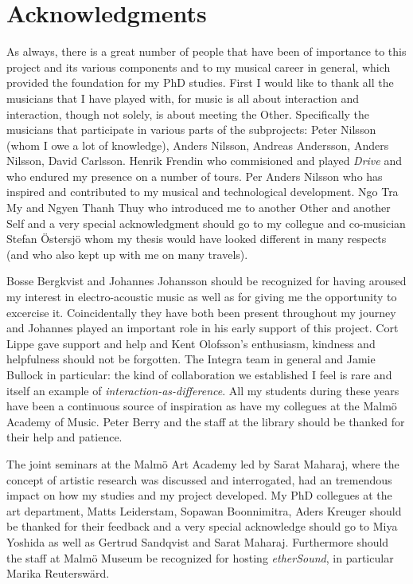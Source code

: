 \chapter{Acknowledgments}
\label{cha:acknowledgments}

As always, there is a great number of people that have been of importance to this project and its various components and to my musical career in general, which provided the foundation for my PhD studies. First I would like to thank all the musicians that I have played with, for music is all about interaction and interaction, though not solely, is about meeting the Other. Specifically the musicians that participate in various parts of the subprojects: Peter Nilsson (whom I owe a lot of knowledge), Anders Nilsson, Andreas
Andersson, Anders Nilsson, David Carlsson. Henrik Frendin who commisioned and played \emph{Drive} and who endured my presence on a number of tours. Per Anders Nilsson who has inspired and contributed to my musical and technological development. Ngo Tra My and Ngyen Thanh Thuy who introduced me to another Other and another Self and a very special acknowledgment should go to my collegue and co-musician Stefan \"{O}stersj\"{o} whom my thesis would have looked different in many respects (and who also kept up with me on many travels).

Bosse Bergkvist and Johannes Johansson should be recognized for having aroused my interest in electro-acoustic music as well as for giving me the opportunity to excercise it. Coincidentally they have both been present throughout my journey and Johannes played an important role in his early support of this project. Cort Lippe gave support and help and Kent Olofsson's enthusiasm, kindness and helpfulness should not be forgotten. The Integra team in general and Jamie Bullock in particular: the kind of collaboration we established I feel is rare and itself an example of \emph{interaction-as-difference}. All my students during these years have been a continuous source of inspiration as have my collegues at the Malm\"{o} Academy of Music. Peter Berry and the staff at the library should be thanked for their help and patience.

The joint seminars at the Malm\"{o} Art Academy led by Sarat Maharaj, where the concept of artistic research was discussed and interrogated, had an tremendous impact on how my studies and my project developed. My PhD collegues at the art department, Matts Leiderstam, Sopawan Boonnimitra, Aders Kreuger should be thanked for their feedback and a very special acknowledge should go to Miya Yoshida as well as Gertrud Sandqvist and Sarat Maharaj. Furthermore should the staff at Malm\"{o} Museum be recognized for hosting \emph{etherSound}, in particular Marika Reutersw\"{a}rd.

